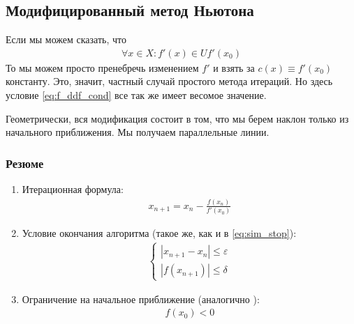 \subsection{Модифицированный метод Ньютона}
Если мы можем сказать, что
\begin{align}
  \forall x \in X \colon f'(x) \in U f'(x_0)
\end{align}
То мы можем просто пренебречь изменением \(f'\) и взять за \(c(x) \equiv f'(x_0)\) константу. Это, значит, частный случай простого метода итераций. Но здесь условие \cref{eq:f_ddf_cond} все так же имеет весомое значение.

Геометрически, вся модификация состоит в том, что мы берем наклон только из начального приближения. Мы получаем параллельные линии.
\subsubsection{Резюме}
\begin{enumerate}
  \item Итерационная формула:
    \begin{align}
      x_{n + 1} = x_n - \frac{f(x_n)}{f'(x_0)}
    \end{align}
  \item Условие окончания алгоритма (такое же, как и в \cref{eq:sim_stop}):
    \begin{align*}
      \begin{cases}
        |x_{n+1} - x_n| \leq \varepsilon \\
        |f(x_{n + 1})| \leq \delta
      \end{cases}
    \end{align*}
  \item Ограничение на начальное приближение (аналогично ):
    \begin{align*}
      f(x_0) < 0
    \end{align*}
\end{enumerate}
